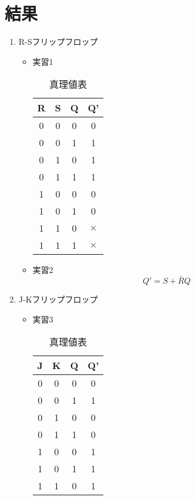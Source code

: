 \documentclass[dvipdfmx]{jsarticle}
\begin{document}
	\section{結果}
		\begin{enumerate}
			\item R-Sフリップフロップ
				\begin{itemize}
					\item 実習1
						\begin{table}[H]
							\center
							\caption{真理値表}
							\begin{tabular}{|c|c|c|c|}
								\hline
								R & S & Q & Q' \\ \hline
								0 & 0 & 0 & 0 \\ \hline
								0 & 0 & 1 & 1 \\ \hline
								0 & 1 & 0 & 1 \\ \hline
								0 & 1 & 1 & 1 \\ \hline
								1 & 0 & 0 & 0 \\ \hline
								1 & 0 & 1 & 0 \\ \hline
								1 & 1 & 0 & $\times$ \\ \hline
								1 & 1 & 1 & $\times$ \\ \hline
							\end{tabular}
						\end{table}
					\item 実習2
						\begin{equation}
							Q' = S + \bar{R} Q
						\end{equation}
				\end{itemize}
			\item J-Kフリップフロップ
				\begin{itemize}
					\item 実習3
						\begin{table}[H]
							\center
							\caption{真理値表}
							\begin{tabular}{|c|c|c|c|}
								\hline
								J & K & Q & Q' \\ \hline
								0 & 0 & 0 & 0 \\ \hline
								0 & 0 & 1 & 1 \\ \hline
								0 & 1 & 0 & 0 \\ \hline
								0 & 1 & 1 & 0 \\ \hline
								1 & 0 & 0 & 1 \\ \hline
								1 & 0 & 1 & 1 \\ \hline
								1 & 1 & 0 & 1 \\ \hline

\end{tabular}
\end{table}
\end{itemize}
\end{enumerate}
\end{document}
